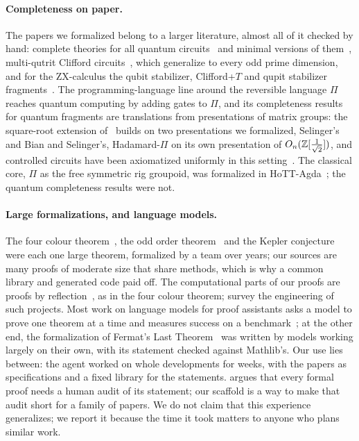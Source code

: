 \paragraph{Completeness on paper.} The papers we formalized belong to a
larger literature, almost all of it checked by hand: complete theories
for all quantum circuits~\cite{clement2023complete} and minimal
versions of them~\cite{clement2024minimal}, multi-qutrit Clifford
circuits~\cite{li2025qutrit}, which \citet{bian2026qupit} generalize to
every odd prime dimension, and for the ZX-calculus the qubit
stabilizer, Clifford+$T$ and qupit stabilizer
fragments~\cite{backens2014zx,jeandel2018zx,booth2022qupitzx,poor2023travaganza}.
The programming-language line around the reversible language $\Pi$
reaches quantum computing by adding gates to $\Pi$, and its
completeness results for quantum fragments are translations from
presentations of matrix groups: the square-root extension
of~\citet{carette2024squareroots} builds on two presentations we
formalized, Selinger's and Bian and Selinger's, Hadamard-$\Pi$ on its
own presentation of $O_n(\mathbb{Z}[\frac1{\sqrt2}])$, and controlled circuits
have been axiomatized uniformly in this
setting~\cite{heunen2026onerig}. The classical core, $\Pi$ as the free
symmetric rig groupoid, was formalized in
HoTT-Agda~\cite{choudhury2022symmetries}; the quantum completeness
results were not.

\paragraph{Large formalizations, and language models.} The four colour
theorem~\cite{gonthier2008fourcolour}, the odd order
theorem~\cite{gonthier2013oddorder} and the Kepler
conjecture~\cite{hales2017kepler} were each one large theorem,
formalized by a team over years; our sources are many proofs of
moderate size that share methods, which is why a common library and
generated code paid off. The computational parts of our proofs are
proofs by reflection~\cite{boutin1997reflection}, as in the four
colour theorem; \citet{ringer2019qed} survey the engineering of such
projects. Most work on language models for proof assistants asks a
model to prove one theorem at a time and measures success on a
benchmark~\cite{first2023baldur,yang2023leandojo,jiang2023dsp}; at the
other end, the formalization of Fermat's Last
Theorem~\cite{anthropic2026flt} was written by models working largely
on their own, with its statement checked against Mathlib's. Our use
lies between: the agent worked on whole developments for weeks, with
the papers as specifications and a fixed library for the statements.
\citet{hales2026reliability} argues that every formal proof needs a
human audit of its statement; our scaffold is a way to make that audit
short for a family of papers. We do not claim that this experience
generalizes; we report it because the time it took matters to anyone
who plans similar work.
